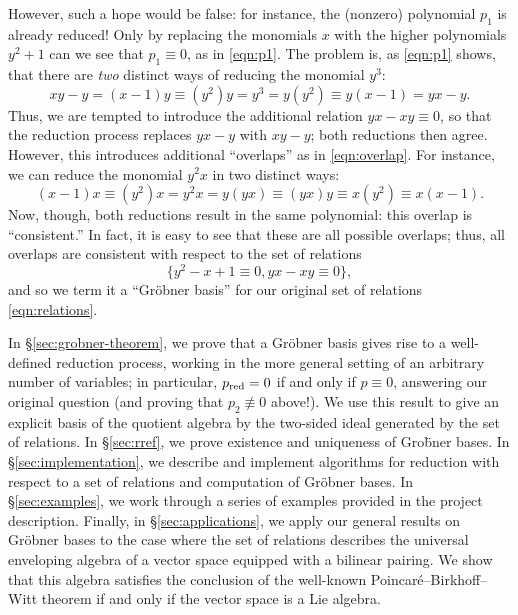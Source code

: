 However, such a hope would be false: for instance, the (nonzero) polynomial $p_1$ is already reduced! Only by replacing the monomials $x$ with the higher polynomials $y^2+1$ can we see that $p_1\equiv 0$, as in \eqref{eqn:p1}. The problem is, as \eqref{eqn:p1} shows, that there are \emph{two} distinct ways of reducing the monomial $y^3$:
\begin{equation}
\label{eqn:overlap}
xy-y=(x-1)y\equiv (y^2)y=y^3=y(y^2)\equiv y(x-1)=yx-y.
\end{equation}
Thus, we are tempted to introduce the additional relation $yx-xy\equiv 0$, so that the reduction process replaces $yx-y$ with $xy-y$; both reductions then agree. However, this introduces additional ``overlaps'' as in \eqref{eqn:overlap}. For instance, we can reduce the monomial $y^2x$ in two distinct ways:
\begin{equation*}
(x-1)x\equiv(y^2)x=y^2x=y(yx)\equiv(yx)y\equiv x(y^2)\equiv x(x-1).
\end{equation*}
Now, though, both reductions result in the same polynomial: this overlap is ``consistent.'' In fact, it is easy to see that these are all possible overlaps; thus, all overlaps are consistent with respect to the set of relations
\begin{equation*}
\{y^2-x+1\equiv 0, yx-xy\equiv 0\},
\end{equation*}
and so we term it a ``Gr\"obner basis'' for our original set of relations \eqref{eqn:relations}.

In \S\ref{sec:grobner-theorem}, we prove that a Gr\"obner basis gives rise to a well-defined reduction process, working in the more general setting of an arbitrary number of variables; in particular, $p_{\mathrm{red}}=0$ if and only if $p\equiv 0$, answering our original question (and proving that $p_2\not\equiv 0$ above!). We use this result to give an explicit basis of the quotient algebra by the two-sided ideal generated by the set of relations. In \S\ref{sec:rref}, we prove existence and uniqueness of Gro\"bner bases. In \S\ref{sec:implementation}, we describe and implement algorithms for reduction with respect to a set of relations and computation of Gr\"obner bases. In \S\ref{sec:examples}, we work through a series of examples provided in the project description. Finally, in \S\ref{sec:applications}, we apply our general results on Gr\"obner bases to the case where the set of relations describes the universal enveloping algebra of a vector space equipped with a bilinear pairing. We show that this algebra satisfies the conclusion of the well-known Poincar\'e--Birkhoff--Witt theorem if and only if the vector space is a Lie algebra.

